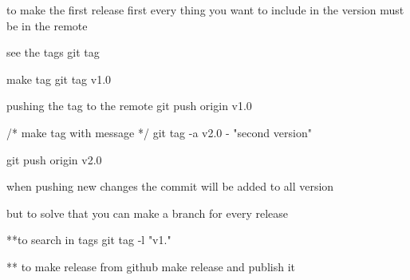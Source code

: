 to make the first release 
first every thing you want to include in the version must be in the remote 

see the tags 
  git tag 

make tag 
  git tag v1.0

pushing the tag to the remote 
git push origin v1.0 

/* make tag with message */
git tag -a v2.0 - "second version"

git push origin v2.0

when pushing new changes 
the commit will be added to all version 

but to solve that you can make a branch for every release

**to search in tags 
git tag -l "v1."

** to make release  
  from github make release and publish it 